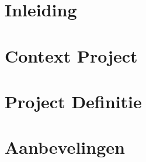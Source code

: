\documentclass{../local}
\begin{document}
\newpage{}
\renewcommand{\thesection}{\arabic{section}}
\setlength{\cftbeforetoctitleskip}{-3em}
\tableofcontents

\clearpage

\chapter{Inleiding}


\chapter{Context Project} 


\chapter{Project Definitie}


\chapter{Aanbevelingen}






\end{document}
